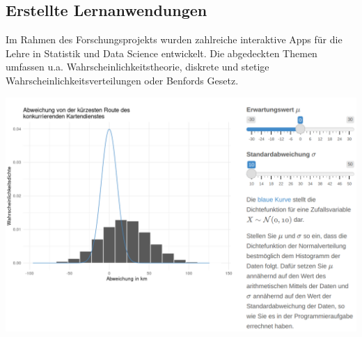 \documentclass[a0,portrait]{a0poster}
\begin{document}
\begin{multicols}{2}


%
%

\section*{Erstellte Lernanwendungen}

Im Rahmen des Forschungsprojekts wurden zahlreiche interaktive Apps für die Lehre in Statistik und Data Science entwickelt. Die abgedeckten Themen umfassen u.a. Wahrscheinlichkeitstheorie, diskrete und stetige Wahrscheinlichkeitsverteilungen oder Benfords Gesetz.%

\begin{center}\vspace{1cm}
\includegraphics[width=0.6\linewidth]{wvstetig}
\end{center}\vspace{1cm}


\end{multicols}
\end{document}
